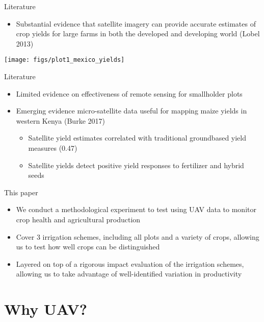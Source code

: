 \documentclass{beamer}
\begin{document}
\begin{frame}{Literature}
	\begin{itemize}
		\item Substantial evidence that satellite imagery can provide accurate estimates of crop yields for large farms in both the developed and developing world (Lobel 2013)
	\end{itemize}
	\texttt{[image: figs/plot1\_mexico\_yields]}
\end{frame}
		
\begin{frame}{Literature}
	\begin{itemize}
		\item Limited evidence on effectiveness of remote sensing for smallholder plots
		\item Emerging evidence micro-satellite data useful for mapping maize yields in western Kenya (Burke 2017)
			\begin{itemize}
				\item Satellite yield estimates correlated with traditional groundbased yield measures (0.47)
				\item Satellite yields detect positive yield responses to fertilizer and hybrid seeds
			\end{itemize}
		\end{itemize}
\end{frame}
		
\begin{frame}{This paper}
	\begin{itemize}
		\item We conduct a methodological experiment to test using UAV data to monitor crop health and agricultural production
		\item Cover 3 irrigation schemes, including all plots and a variety of crops, allowing us to test how well crops can be distinguished
		\item Layered on top of a rigorous impact evaluation of the irrigation schemes, allowing us to take advantage of well-identified variation in productivity
	\end{itemize}
\end{frame}


\section{Why UAV?}
						
\end{document}
